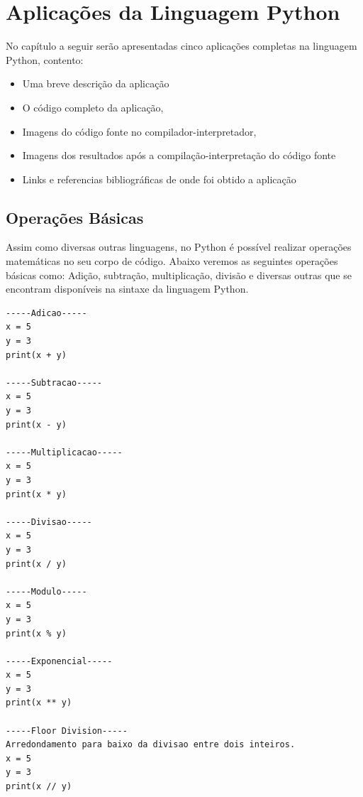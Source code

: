 


\chapter{ Aplica\c{c}\~{o}es da Linguagem Python}

No capítulo a seguir serão apresentadas cinco aplica\c{c}\~{o}es completas na linguagem Python, contento:
\begin{itemize}
  \item Uma breve descri\c{c}\~{a}o da aplica\c{c}\~{a}o
  \item O c\'{o}digo completo da aplica\c{c}\~{a}o,
  \item Imagens do c\'{o}digo fonte no compilador-interpretador,
  \item Imagens dos resultados ap\'{o}s a compila\c{c}\~{a}o-interpreta\c{c}\~{a}o do c\'{o}digo fonte
  \item Links e referencias bibliogr\'{a}ficas de onde foi obtido a aplica\c{c}\~{a}o
\end{itemize}




    \section{Opera\c{c}\~{o}es Básicas}

Assim como diversas outras linguagens, no Python é possível realizar operações matemáticas no seu corpo de código. Abaixo veremos as seguintes operações básicas como: Adição, subtração, multiplicação, divisão e diversas outras que se encontram disponíveis na sintaxe da linguagem Python.

\begin{lstlisting}
-----Adicao-----	
x = 5
y = 3
print(x + y)

-----Subtracao-----
x = 5
y = 3
print(x - y)	
	
-----Multiplicacao-----
x = 5
y = 3
print(x * y)

-----Divisao-----
x = 5
y = 3
print(x / y)

-----Modulo-----
x = 5
y = 3
print(x % y)

-----Exponencial-----
x = 5
y = 3
print(x ** y)

-----Floor Division-----
Arredondamento para baixo da divisao entre dois inteiros.
x = 5
y = 3
print(x // y)
\end{lstlisting}

